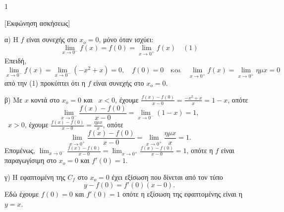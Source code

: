 \begin{ylh}{1}
    \item [ΛΥΣΗ]
\end{ylh}
[Εκφώνηση ασκήσεως]
\begin{alist}
    \item α) Η $f$ είναι συνεχής στο $x_o = 0$, μόνο όταν ισχύει:
    \[ \lim_{x \to 0^-} f(x) = f(0) = \lim_{x \to 0^+} f(x) \quad (1) \]
    Επειδή,
    \[ \lim_{x \to 0^-} f(x) = \lim_{x \to 0^-} (-x^2 + x) = 0, \quad f(0) = 0 \quad \text{και} \quad \lim_{x \to 0^+} f(x) = \lim_{x \to 0^+} \eta\mu x = 0 \]
    από την (1) προκύπτει ότι η $f$ είναι συνεχής στο $x_o = 0$.

    \item β) Με $x$ κοντά στο $x_o = 0$ και
    \textbullet \ $x < 0$, έχουμε $\frac{f(x) - f(0)}{x - 0} = \frac{-x^2 + x}{x} = 1 - x$, οπότε
    \[ \lim_{x \to 0^-} \frac{f(x) - f(0)}{x - 0} = \lim_{x \to 0^-} (1 - x) = 1, \]
    \textbullet \ $x > 0$, έχουμε $\frac{f(x) - f(0)}{x - 0} = \frac{\eta\mu x}{x}$, οπότε
    \[ \lim_{x \to 0^+} \frac{f(x) - f(0)}{x - 0} = \lim_{x \to 0^+} \frac{\eta\mu x}{x} = 1. \]
    Επομένως, $\lim_{x \to 0^-} \frac{f(x) - f(0)}{x - 0} = \lim_{x \to 0^+} \frac{f(x) - f(0)}{x - 0} = 1$, οπότε η $f$ είναι παραγωγίσιμη στο $x_o = 0$ και
    $f'(0) = 1$.

    \item γ) Η εφαπτομένη της $C_f$ στο $x_o = 0$ έχει εξίσωση που δίνεται από τον τύπο
    \[ y - f(0) = f'(0)(x - 0) . \]
    Εδώ έχουμε $f(0) = 0$ και $f'(0) = 1$ οπότε η εξίσωση της εφαπτομένης είναι η $y = x$.
\end{alist}